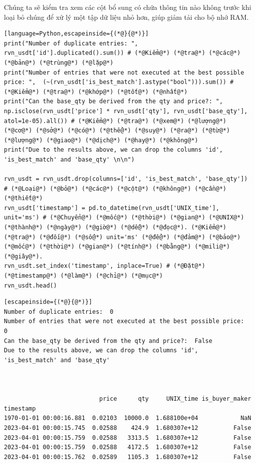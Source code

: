 Chúng ta sẽ kiểm tra xem các cột bổ sung có chứa thông tin nào không trước khi loại bỏ chúng để xử lý một tập dữ liệu nhỏ hơn, giúp giảm tải cho bộ nhớ RAM.

\begin{lstlisting}[language=Python,escapeinside={(*@}{@*)}]
print("Number of duplicate entries: ", rvn_usdt['id'].duplicated().sum()) # (*@Kiểm@*) (*@tra@*) (*@các@*) (*@bản@*) (*@trùng@*) (*@lặp@*)
print("Number of entries that were not executed at the best possible price: ",  (~(rvn_usdt['is_best_match'].astype("bool"))).sum()) # (*@Kiểm@*) (*@tra@*) (*@khớp@*) (*@tốt@*) (*@nhất@*)
print("Can the base_qty be derived from the qty and price?: ", np.isclose(rvn_usdt['price'] * rvn_usdt['qty'], rvn_usdt['base_qty'], atol=1e-05).all()) # (*@Kiểm@*) (*@tra@*) (*@xem@*) (*@lượng@*) (*@cơ@*) (*@sở@*) (*@có@*) (*@thể@*) (*@suy@*) (*@ra@*) (*@từ@*) (*@lượng@*) (*@giao@*) (*@dịch@*) (*@hay@*) (*@không@*)
print("Due to the results above, we can drop the columns 'id', 'is_best_match' and 'base_qty' \n\n")

rvn_usdt = rvn_usdt.drop(columns=['id', 'is_best_match', 'base_qty']) # (*@Loại@*) (*@bỏ@*) (*@các@*) (*@cột@*) (*@không@*) (*@cần@*) (*@thiết@*)
rvn_usdt['timestamp'] = pd.to_datetime(rvn_usdt['UNIX_time'], unit='ms') # (*@Chuyển@*) (*@mốc@*) (*@thời@*) (*@gian@*) (*@UNIX@*) (*@thành@*) (*@ngày@*) (*@giờ@*) (*@dễ@*) (*@đọc@*). (*@Kiểm@*) (*@tra@*) (*@đối@*) (*@số@*) unit='ms' (*@để@*) (*@đảm@*) (*@bảo@*) (*@mốc@*) (*@thời@*) (*@gian@*) (*@tính@*) (*@bằng@*) (*@mili@*) (*@giây@*).
rvn_usdt.set_index('timestamp', inplace=True) # (*@Đặt@*) (*@timestamp@*) (*@làm@*) (*@chỉ@*) (*@mục@*)
rvn_usdt.head()
\end{lstlisting}

\begin{lstlisting}[escapeinside={(*@}{@*)}]
Number of duplicate entries:  0
Number of entries that were not executed at the best possible price:  0
Can the base_qty be derived from the qty and price?:  False
Due to the results above, we can drop the columns 'id', 'is_best_match' and 'base_qty' 



                           price      qty     UNIX_time is_buyer_maker
timestamp                                                             
1970-01-01 00:00:16.881  0.02103  10000.0  1.688100e+04            NaN
2023-04-01 00:00:15.745  0.02588    424.9  1.680307e+12          False
2023-04-01 00:00:15.759  0.02588   3313.5  1.680307e+12          False
2023-04-01 00:00:15.759  0.02588   4172.5  1.680307e+12          False
2023-04-01 00:00:15.762  0.02589   1105.3  1.680307e+12          False
\end{lstlisting}

